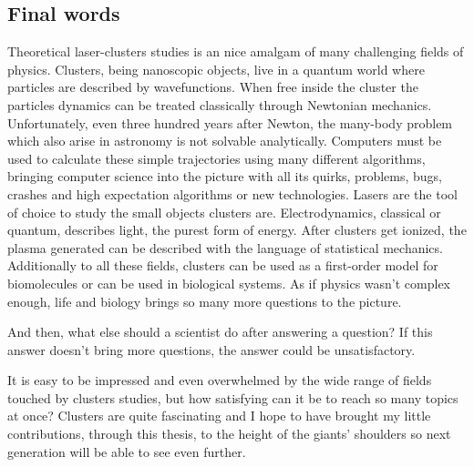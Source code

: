 \subsection{Final words}

Theoretical laser-clusters studies is an nice amalgam of many challenging
fields of physics. Clusters, being nanoscopic objects, live in a quantum world
where particles are described by wavefunctions. When free inside the cluster
the particles dynamics can be treated classically through Newtonian mechanics.
Unfortunately, even three hundred years after Newton, the many-body problem
which also arise in astronomy is not solvable analytically.
Computers must be used to calculate these simple trajectories
using many different algorithms, bringing computer science into the picture
with all its quirks, problems, bugs, crashes and high expectation algorithms or
new technologies. Lasers are the tool of choice to study the small objects
clusters are. Electrodynamics, classical or quantum, describes light, the purest
form of energy. After clusters get ionized,
the plasma generated can be described with the language of statistical mechanics.
Additionally to all these fields, clusters can be used as a first-order model
for biomolecules or can be used in biological systems. As if physics wasn't
complex enough, life and biology brings so many more questions to the picture.

And then, what else should a scientist do
after answering a question? If this answer doesn't bring more questions, the
answer could be unsatisfactory.

It is easy to be impressed and even overwhelmed by the wide range of fields
touched by clusters studies, but how satisfying can it be to reach so many
topics at once? Clusters are quite fascinating and I hope to have
brought my little contributions, through this thesis, to the height of the giants'
shoulders so next generation will be able to see even further.
